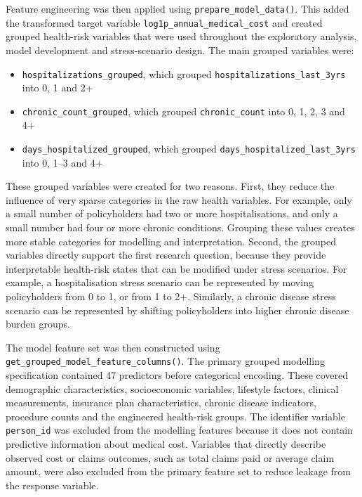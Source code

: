 \documentclass[11pt]{article}
\begin{document}
	Feature engineering was then applied using \verb|prepare_model_data()|. This added the transformed target variable \verb|log1p_annual_medical_cost| and created grouped health-risk variables that were used throughout the exploratory analysis, model development and stress-scenario design. The main grouped variables were:
	
	\begin{itemize}
		\item \verb|hospitalizations_grouped|, which grouped \verb|hospitalizations_last_3yrs| into 0, 1 and 2+
		\item \verb|chronic_count_grouped|, which grouped \verb|chronic_count| into 0, 1, 2, 3 and 4+
		\item \verb|days_hospitalized_grouped|, which grouped \verb|days_hospitalized_last_3yrs| into 0, 1--3 and 4+
	\end{itemize}
	
	These grouped variables were created for two reasons. First, they reduce the influence of very sparse categories in the raw health variables. For example, only a small number of policyholders had two or more hospitalisations, and only a small number had four or more chronic conditions. Grouping these values creates more stable categories for modelling and interpretation. Second, the grouped variables directly support the first research question, because they provide interpretable health-risk states that can be modified under stress scenarios. For example, a hospitalisation stress scenario can be represented by moving policyholders from 0 to 1, or from 1 to 2+. Similarly, a chronic disease stress scenario can be represented by shifting policyholders into higher chronic disease burden groups.
	
	The model feature set was then constructed using \verb|get_grouped_model_feature_columns()|. The primary grouped modelling specification contained 47 predictors before categorical encoding. These covered demographic characteristics, socioeconomic variables, lifestyle factors, clinical measurements, insurance plan characteristics, chronic disease indicators, procedure counts and the engineered health-risk groups. The identifier variable \verb|person_id| was excluded from the modelling features because it does not contain predictive information about medical cost. Variables that directly describe observed cost or claims outcomes, such as total claims paid or average claim amount, were also excluded from the primary feature set to reduce leakage from the response variable.
	
\end{document}

